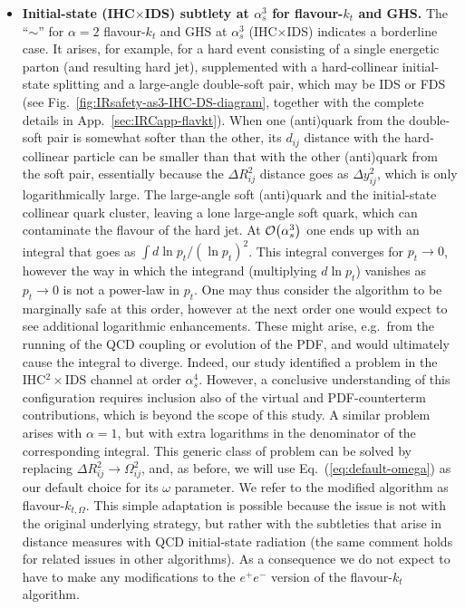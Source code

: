 \documentclass[nofootinbib,twocolumn,preprintnumbers,superscriptaddress,aps]{revtex4-2}
\newcommand{\as}{\alpha_s}
\newcommand{\order}[1]{{\cal O}\!\left(#1\right)}
\begin{document}
\begin{itemize}
\item \textbf{Initial-state (IHC$\times$IDS) subtlety at $\as^3$ for flavour-$k_t$ and GHS.}
   The ``$\sim$'' for $\alpha=2$ flavour-$k_t$ and GHS at $\as^3$
  (IHC$\times$IDS) indicates a borderline case.
  It arises, for example, for a hard event consisting of a single
  energetic parton (and resulting hard jet), supplemented with 
  a hard-collinear initial-state splitting and a large-angle double-soft pair, which may be IDS or FDS (see
  Fig.~\ref{fig:IRsafety-as3-IHC-DS-diagram}, together with the
  complete details in App.~\ref{sec:IRCapp-flavkt}).
  When one (anti)quark from the double-soft pair is somewhat softer
  than the other, its $d_{ij}$ distance with the hard-collinear
  particle can be smaller than that with the other (anti)quark from
  the soft pair, essentially because the $\Delta R_{ij}^2$ distance
  goes as $\Delta y_{ij}^2$, which is only logarithmically
  large.
  The large-angle soft (anti)quark and the initial-state collinear quark
  cluster, leaving a lone large-angle soft quark, which can contaminate
  the flavour of the hard jet.
  At $\order{\as^3}$ one ends up with an integral that goes as $\int
  d\ln p_t / (\ln p_t)^2$.
  This integral converges for $p_t \to 0$, however the way in which the integrand
  (multiplying $d\ln p_t$) vanishes as $p_t \to 0$ is not a power-law
  in $p_t$.
  One may thus consider the algorithm to be marginally safe at this
  order, however at the next order one would expect to see additional
  logarithmic enhancements.
  These might arise, e.g.\ from the running of the QCD coupling or
  evolution of the PDF, and would ultimately cause the integral to
  diverge.
  Indeed, our study identified a problem in the
  IHC$^2\times$IDS channel at order $\as^4$.
  However, a conclusive understanding of this configuration requires
  inclusion also of the virtual and PDF-counterterm contributions,
  which is beyond the scope of this study.
  A similar problem arises with $\alpha=1$, but with extra
  logarithms in the denominator of the corresponding
  integral. 
  This generic class of problem can be solved by replacing
  $\Delta R_{ij}^2 \to \Omega_{ij}^2$, and, as before, we will use
  Eq.~(\ref{eq:default-omega}) as our default choice for its $\omega$
  parameter.
  We refer to the modified algorithm as flavour-$k_{t,\Omega}$.
  This simple adaptation is possible because the issue is not with the
  original underlying strategy, but rather with the subtleties that
  arise in distance measures with QCD initial-state radiation (the
  same comment holds for related issues in other algorithms).
  As a consequence we do not expect to have to make any modifications to
  the $e^+e^-$ version of the flavour-$k_t$ algorithm.
  

\end{itemize}
\end{document}
